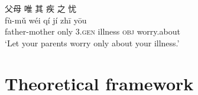 \documentclass[UTF8, a4paper, oneside, scheme=plain, 12pt]{ctexrep}
\newcommand{\translate}[1]{`#1'}
\newcommand*{\category}[1]{\textsc{#1}}
\begin{document}
\begin{exe}
    \ex
    \glll 父母 唯 其 疾 之 忧 \\
    fù-mǔ wéi qí jí zhī yōu \\
    father-mother only 3.\category{gen} illness \category{obj} worry.about \\
    \glt\translate{Let your parents worry only about your illness.}
\end{exe}


\printbibliography[title=References]

\appendix

\chapter{Theoretical framework}\label{chap:intro.theory}
\end{document}
